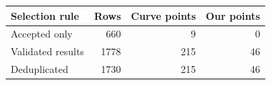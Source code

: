 \begin{tabular}{lrrr}
\toprule
Selection rule & Rows & Curve points & Our points \\
\midrule
Accepted only & 660 & 9 & 0 \\
Validated results & 1778 & 215 & 46 \\
Deduplicated & 1730 & 215 & 46 \\
\bottomrule
\end{tabular}

